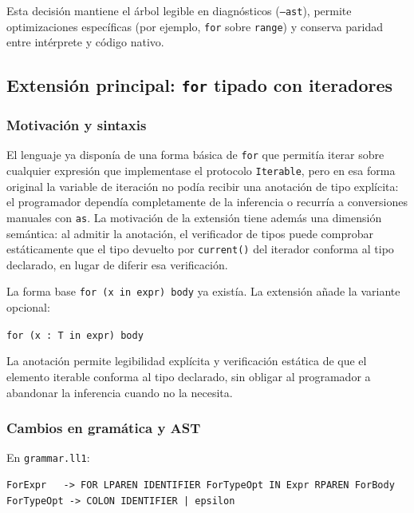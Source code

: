 \documentclass[11pt,a4paper]{article}
\begin{document}
Esta decisión mantiene el árbol legible en diagnósticos (\texttt{--ast}), permite optimizaciones específicas (por ejemplo, \texttt{for} sobre \texttt{range}) y conserva paridad entre intérprete y código nativo.

\subsection{Extensión principal: \texttt{for} tipado con iteradores}

\subsubsection{Motivación y sintaxis}

El lenguaje ya disponía de una forma básica de \texttt{for} que permitía iterar sobre cualquier expresión que implementase el protocolo \texttt{Iterable}, pero en esa forma original la variable de iteración no podía recibir una anotación de tipo explícita: el programador dependía completamente de la inferencia o recurría a conversiones manuales con \texttt{as}. La motivación de la extensión tiene además una dimensión semántica: al admitir la anotación, el verificador de tipos puede comprobar estáticamente que el tipo devuelto por \texttt{current()} del iterador conforma al tipo declarado, en lugar de diferir esa verificación.

La forma base \texttt{for (x in expr) body} ya existía. La extensión añade la variante opcional:

\begin{center}
\texttt{for (x : T in expr) body}
\end{center}

La anotación permite legibilidad explícita y verificación estática de que el elemento iterable conforma al tipo declarado, sin obligar al programador a abandonar la inferencia cuando no la necesita.

\subsubsection{Cambios en gramática y AST}

En \texttt{grammar.ll1}:

\begin{lstlisting}[language={},numbers=none,frame=none,backgroundcolor=\color{white}]
ForExpr   -> FOR LPAREN IDENTIFIER ForTypeOpt IN Expr RPAREN ForBody
ForTypeOpt -> COLON IDENTIFIER | epsilon
\end{lstlisting}
\end{document}
